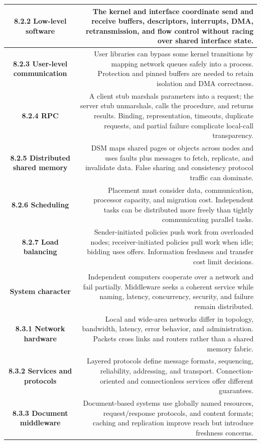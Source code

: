 \documentclass[10pt,letterpaper]{article}
\begin{document}
\begin{longtable}{C N}
\textbf{8.2.2 Low-level software} & The kernel and interface coordinate send and receive buffers, descriptors, interrupts, DMA, retransmission, and flow control without racing over shared interface state.\\\hline
\textbf{8.2.3 User-level communication} & User libraries can bypass some kernel transitions by mapping network queues safely into a process. Protection and pinned buffers are needed to retain isolation and DMA correctness.\\\hline
\textbf{8.2.4 RPC} & A client stub marshals parameters into a request; the server stub unmarshals, calls the procedure, and returns results. Binding, representation, timeouts, duplicate requests, and partial failure complicate local-call transparency.\\\hline
\textbf{8.2.5 Distributed shared memory} & DSM maps shared pages or objects across nodes and uses faults plus messages to fetch, replicate, and invalidate data. False sharing and consistency protocol traffic can dominate.\\\hline
\textbf{8.2.6 Scheduling} & Placement must consider data, communication, processor capacity, and migration cost. Independent tasks can be distributed more freely than tightly communicating parallel tasks.\\\hline
\textbf{8.2.7 Load balancing} & Sender-initiated policies push work from overloaded nodes; receiver-initiated policies pull work when idle; bidding uses offers. Information freshness and transfer cost limit decisions.\\\hline
{}\\*\hline
\textbf{System character} & Independent computers cooperate over a network and fail partially. Middleware seeks a coherent service while naming, latency, concurrency, security, and failure remain distributed.\\\hline
\textbf{8.3.1 Network hardware} & Local and wide-area networks differ in topology, bandwidth, latency, error behavior, and administration. Packets cross links and routers rather than a shared memory fabric.\\\hline
\textbf{8.3.2 Services and protocols} & Layered protocols define message formats, sequencing, reliability, addressing, and transport. Connection-oriented and connectionless services offer different guarantees.\\\hline
\textbf{8.3.3 Document middleware} & Document-based systems use globally named resources, request/response protocols, and content formats; caching and replication improve reach but introduce freshness concerns.\\\hline

\end{longtable}
\end{document}
